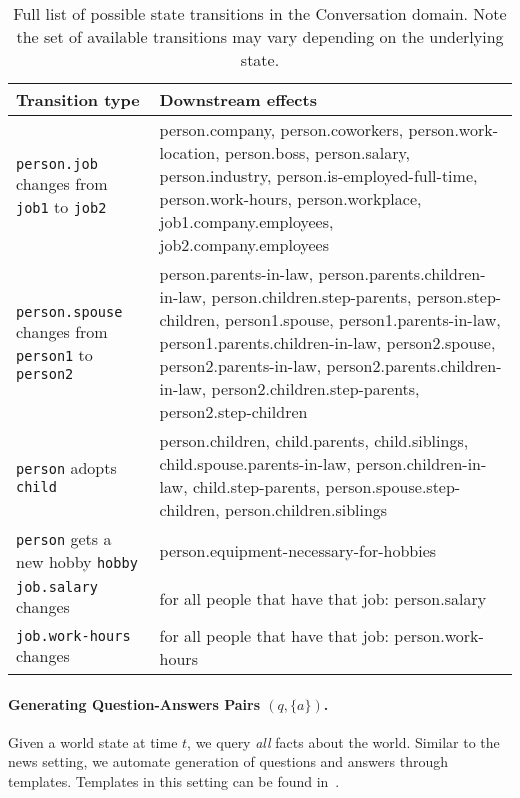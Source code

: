 \begin{table*}[]
    \centering
    \begin{tabular}{p{4cm}p{10cm}}
    \toprule
        Transition type & Downstream effects \\ \midrule
        \texttt{person.job} changes from \texttt{job1} to \texttt{job2} & 
        person.company, person.coworkers, person.work-location, person.boss, person.salary, person.industry, person.is-employed-full-time, person.work-hours, person.workplace, job1.company.employees, job2.company.employees \\ \midrule
        \texttt{person.spouse} changes from \texttt{person1} to \texttt{person2} & person.parents-in-law, person.parents.children-in-law, person.children.step-parents, person.step-children, person1.spouse, person1.parents-in-law, person1.parents.children-in-law, person2.spouse, person2.parents-in-law, person2.parents.children-in-law, person2.children.step-parents, person2.step-children \\ \midrule
        \texttt{person} adopts \texttt{child} & person.children, child.parents, child.siblings, child.spouse.parents-in-law, person.children-in-law, child.step-parents, person.spouse.step-children, person.children.siblings \\ \midrule
        \texttt{person} gets a new hobby \texttt{hobby} & person.equipment-necessary-for-hobbies \\ \midrule
        \texttt{job.salary} changes & for all people that have that job: person.salary \\ \midrule
        \texttt{job.work-hours} changes & for all people that have that job: person.work-hours \\
        \bottomrule
    \end{tabular}
    \caption{Full list of possible state transitions in the Conversation domain. Note the set of available transitions may vary depending on the underlying state.}
    \label{tab:convo_transitions}
\end{table*}



\paragraph{Generating Question-Answers Pairs $(q,\{a\})$.} Given a world state at time $t$, we query \textit{all} facts about the world. Similar to the news setting, we automate generation of questions and answers through templates. Templates in this setting can be found in~.


